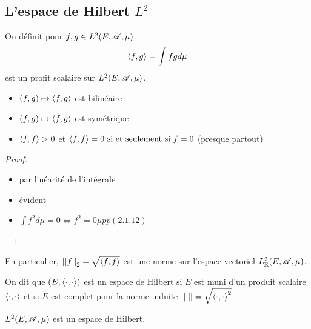 \subsection{L'espace de Hilbert $L^2$}

\begin{definition}
	On définit pour $f,g \in L^2(E,\mathscr{A}, \mu)$.
	$$\left\langle f, g \right\rangle = \int fg d \mu$$
	est un profit scalaire sur $L^2(E, \mathscr{A}, \mu)$.
	\begin{itemize}
		\item $(f,g) \mapsto \left\langle f, g \right\rangle$ est bilinéaire
		\item $(f,g) \mapsto \left\langle f, g \right\rangle$ est symétrique
		\item $\left\langle f, f \right\rangle > 0$ et $\left\langle f, f \right\rangle = 0 \text{ si et seulement si } f = 0$ (presque partout)
	\end{itemize}
\end{definition}


\begin{proof}
	\begin{itemize}
		\item par linéarité de l'intégrale
		\item évident
		\item $ \int f^2 d \mu = 0 \iff f^2 = 0 \mu pp (2.1.12)$
	\end{itemize}
\end{proof}


\begin{remarque}
	En particulier, $\left|\left|f\right|\right|_2 = \sqrt{\left\langle f, f \right\rangle}$ est une norme sur l'espace vectoriel $L^2_{\mathbb{R}}(E, \mathscr{A}, \mu)$.
\end{remarque}

\begin{definition}
	On dit que $(E, \left\langle \cdot, \cdot \right\rangle)$  est un espace de Hilbert si $E$ est muni d'un produit scalaire $\left\langle \cdot, \cdot \right\rangle$ et
	si $E$ est complet pour la norme induite $\left|\left|\cdot\right|\right| = \sqrt{\left\langle \cdot, \cdot \right\rangle^2}$.
\end{definition}

\begin{theorem}[Riesz]
	$L^2(E, \mathscr{A}, \mu)$ est un espace de Hilbert.
\end{theorem}

